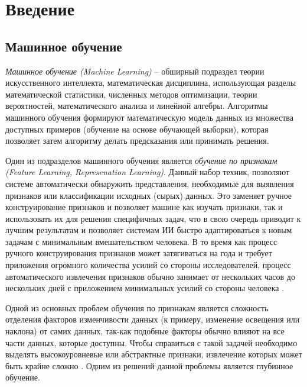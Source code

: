 \section{Введение} \label{section:introduction}


\subsection{Машинное обучение}
\textit{Машинное обучение (Machine Learning)} – обширный подраздел теории искусственного интеллекта, математическая дисциплина, использующая разделы математической статистики, численных методов оптимизации, теории вероятностей, математического анализа и линейной алгебры. 
Алгоритмы машинного обучения формируют математическую модель данных из множества доступных примеров (обучение на основе обучающей выборки), которая позволяет затем алгоритму делать предсказания или принимать решения. 


Один из подразделов машинного обучения является \textit{обучение по признакам (Feature Learning, Represenation Learning)}. Данный набор техник, позволяют системе автоматически обнаружить представления, необходимые для выявления признаков или классификации исходных (сырых) данных. Это заменяет ручное конструирование признаков и позволяет машине как изучать признаки, так и использовать их для решения специфичных задач, что в свою очередь приводит к лучшим результатам и позволяет системам ИИ быстро адаптироваться к новым задачам с минимальным вмешательством человека. В то время как процесс ручного конструирования признаков может затягиваться на года и требует приложения огромного количества усилий со стороны исследователей, процесс автоматического извлечения признаков обычно занимает от нескольких часов до нескольких дней с приложением минимальных усилий со стороны человека \cite{DLB}.

Одной из основных проблем обучения по признакам является сложность отделения факторов изменчивости данных (к примеру, изменение освещения или наклона) от самих данных, так-как подобные факторы обычно влияют на все части данных, которые доступны. Чтобы справиться с такой задачей необходимо выделять высокоуровневые или абстрактные признаки, извлечение которых может быть крайне сложно \cite{DLB}. Одним из решений данной проблемы является глубинное обучение.

